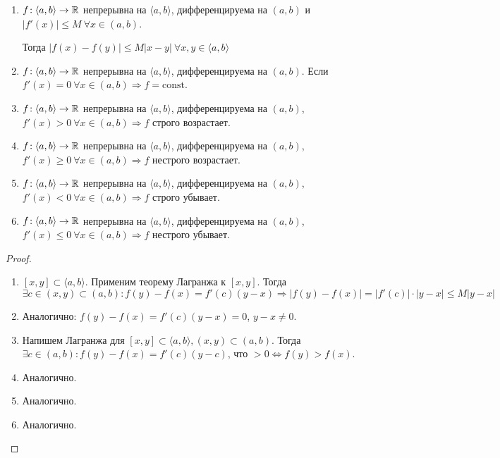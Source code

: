 \begin{consequence}
    \slashn
    \begin{enumerate}
        \item $f\!:\langle a, b \rangle \to \mathbb{R}$ непрерывна на  $\langle a, b \rangle$, дифференцируема на $(a, b)$ и  $|f'(x)| \le M\ \forall x \in (a, b)$. 

            Тогда $|f(x) - f(y)| \le M|x-y|\ \forall x, y \in \langle a, b \rangle$ 
        \item  $f\!:\langle a, b \rangle \to \mathbb{R}$ непрерывна на  $\langle a, b \rangle$, дифференцируема на $(a, b)$. Если $f'(x) = 0\ \forall x \in (a, b) \Rightarrow f = \text{const}$. 
        \item  $f\!:\langle a, b \rangle \to \mathbb{R}$ непрерывна на  $\langle a, b \rangle$, дифференцируема на $(a, b)$, $f'(x) > 0\ \forall x \in (a, b) \Rightarrow f$ строго возрастает.
        \item  $f\!:\langle a, b \rangle \to \mathbb{R}$ непрерывна на  $\langle a, b \rangle$, дифференцируема на $(a, b)$, $f'(x) \ge 0\ \forall x \in (a, b) \Rightarrow f$ нестрого возрастает.
        \item  $f\!:\langle a, b \rangle \to \mathbb{R}$ непрерывна на  $\langle a, b \rangle$, дифференцируема на $(a, b)$, $f'(x) < 0\ \forall x \in (a, b) \Rightarrow f$ строго убывает.
        \item  $f\!:\langle a, b \rangle \to \mathbb{R}$ непрерывна на  $\langle a, b \rangle$, дифференцируема на $(a, b)$, $f'(x) \le 0\ \forall x \in (a, b) \Rightarrow f$ нестрого убывает.
    \end{enumerate}
\end{consequence}
\begin{proof}
\slashn
    \begin{enumerate}
        \item $[x, y] \subset \langle a, b \rangle$. Применим теорему Лагранжа к  $[x, y]$. Тогда  $\exists c \in (x, y) \subset (a, b)\!: f(y)-f(x) = f'(c)(y-x) \Rightarrow |f(y) - f(x)| = |f'(c)| \cdot |y-x| \le M|y-x|$ 
        \item Аналогично: $f(y)-f(x) = f'(c)(y - x) = 0$,  $y - x \neq 0$. 
        \item Напишем Лагранжа для $[x, y] \subset \langle a, b \rangle, (x, y) \subset (a, b)$. 
            Тогда  $\exists c \in (a, b)\!: f(y) - f(x) = f'(c)(y-c)$, что  $>0 \iff f(y) >f(x).$
        \item Аналогично.
        \item Аналогично.
        \item Аналогично.
    \end{enumerate}
\end{proof}
